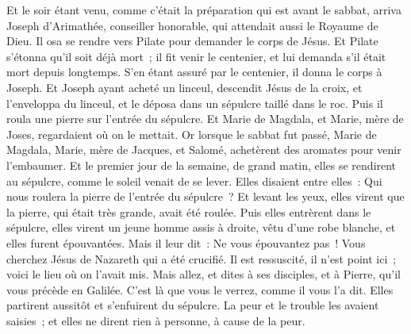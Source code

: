 \begin{multicols}{2}
Et le soir étant venu, comme c'était la préparation qui est avant le sabbat,
arriva Joseph d'Arimathée, conseiller honorable, qui attendait aussi le Royaume de Dieu. Il osa se rendre vers Pilate pour demander le corps de Jésus.
Et Pilate s'étonna qu'il soit déjà mort~; il fit venir le centenier, et lui demanda s'il était mort depuis longtemps.
S'en étant assuré par le centenier, il donna le corps à Joseph.
Et Joseph ayant acheté un linceul, descendit Jésus de la croix, et l'enveloppa du linceul, et le déposa dans un sépulcre taillé dans le roc. Puis il roula une pierre sur l'entrée du sépulcre.
Et Marie de Magdala, et Marie, mère de Joses, regardaient où on le mettait.
\VerseOne{}Or lorsque le sabbat fut passé, Marie de Magdala, Marie, mère de Jacques, et Salomé, achetèrent des aromates pour venir l'embaumer.
Et le premier jour de la semaine, de grand matin, elles se rendirent au sépulcre, comme le soleil venait de se lever.
Elles disaient entre elles~: Qui nous roulera la pierre de l'entrée du sépulcre~?
Et levant les yeux, elles virent que la pierre, qui était très grande, avait été roulée.
Puis elles entrèrent dans le sépulcre, elles virent un jeune homme assis à droite, vêtu d'une robe blanche, et elles furent épouvantées.
Mais il leur dit~: Ne vous épouvantez pas~! Vous cherchez Jésus de Nazareth qui a été crucifié. Il est ressuscité, il n'est point ici~; voici le lieu où on l'avait mis.
Mais allez, et dites à ses disciples, et à Pierre, qu'il vous précède en Galilée. C'est là que vous le verrez, comme il vous l'a dit.
Elles partirent aussitôt et s'enfuirent du sépulcre. La peur et le trouble les avaient saisies~; et elles ne dirent rien à personne, à cause de la peur.

\end{multicols}
